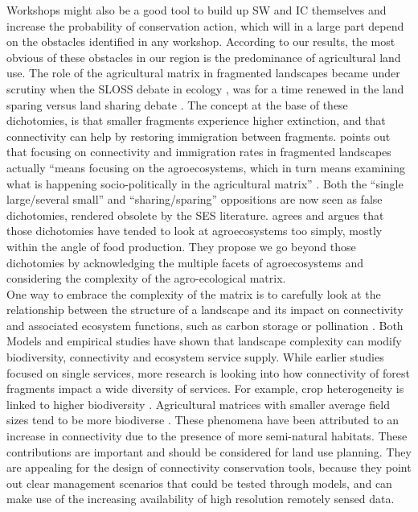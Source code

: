 \documentclass[12pt,Bold,TexShade]{thesis/mcgilletdclass}
\begin{document}
{Workshops might also be a good tool to build up SW and IC themselves and increase the probability of conservation action, which will in a large part depend on the obstacles identified in any workshop. According to our results, the most obvious of these obstacles in our region is the predominance of agricultural land use. The role of the agricultural matrix in fragmented landscapes became under scrutiny when the SLOSS debate in ecology \citep{diamond_island_1975, simberloff_island_1976}, was for a time renewed in the land sparing versus land sharing debate \citep{fischer_land_2014}. The concept at the base of these dichotomies, is that smaller fragments experience higher extinction, and that connectivity can help by restoring immigration between fragments. \cite{perfecto_natures_2019} points out that focusing on connectivity and immigration rates in fragmented landscapes actually “means focusing on the agroecosystems, which in turn means examining what is happening socio-politically in the agricultural matrix” \citep{perfecto_natures_2019}. Both the “single large/several small” and “sharing/sparing” oppositions are now seen as false dichotomies, rendered obsolete by the SES literature. \cite{bennett_changing_2017} agrees and argues that those dichotomies have tended to look at agroecosystems too simply, mostly within the angle of food production. They propose we go beyond those dichotomies by acknowledging the multiple facets of agroecosystems and considering the complexity of the agro-ecological matrix. \\

One way to embrace the complexity of the matrix is to carefully look at the relationship between the structure of a landscape and its impact on connectivity and associated ecosystem functions, such as carbon storage or pollination \citep{mitchell_linking_2013}. Both Models \citep{mitchell_strong_2015} and empirical studies \citep{mitchell_forest_2014} have shown that landscape complexity can modify biodiversity, connectivity and ecosystem service supply. While earlier studies focused on single services, more research is looking into how connectivity of forest fragments impact a wide diversity of services\citep{mitchell_forest_2014}. For example, crop heterogeneity is linked to higher biodiversity \citep{sirami_increasing_2019}. Agricultural matrices with smaller average field sizes tend to be more biodiverse \citep{fahrig_farmlands_2015}. These phenomena have been attributed to an increase in connectivity due to the presence of more semi-natural habitats. These contributions are important and should be considered for land use planning. They are appealing for the design of connectivity conservation tools, because they point out clear management scenarios that could be tested through models, and can make use of the increasing availability of high resolution remotely sensed data. \\

}
\end{document}
